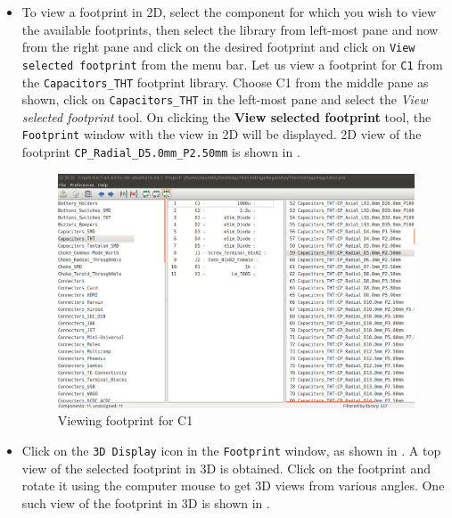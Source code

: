 \begin{itemize}

\item To view a footprint in 2D, select the component for which you wish to view the available footprints, then select the library from left-most pane and now from the right pane and click on the desired footprint and click on \texttt{View selected footprint} from the menu bar. 
Let us view a footprint for \texttt{C1} from the \texttt{Capacitors\_THT} footprint library. Choose C1 from the middle pane as shown, click on \texttt{Capacitors\_THT} in the left-most pane and select the  
\textit{View selected footprint} tool.
On clicking the \textbf{View selected footprint} tool, the {\tt Footprint} window with the view in 2D will be displayed. 2D view of the footprint \texttt{CP\_Radial\_D5.0mm\_P2.50mm} is shown in .

\begin{figure}
\centering
\includegraphics[width=\lgfig]{smnew.png}
\caption{Viewing footprint for C1}
\label{sm}
\end{figure}

\item Click on the \texttt{3D Display} icon in the {\tt Footprint}
window, as shown in . A top view of the selected footprint
in 3D is obtained. Click on the footprint and rotate it using the computer mouse to
get 3D views from various angles. One such view of the footprint
in 3D is shown in .

\end{itemize}


